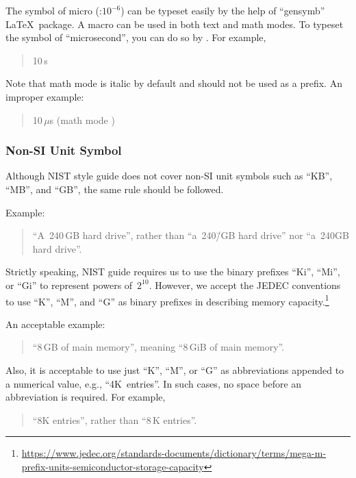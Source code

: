 The symbol of micro (\micro :$10^{-6}$) can be typeset easily by
the help of ``gensymb'' \LaTeX\ package.
A macro \qco{\\micro} can be used in both text and math modes.
To typeset the symbol of ``microsecond'', you can do
so by .
For example,
\begin{quote}
  10\,\micro s
\end{quote}

Note that math mode \qco{\\mu} is italic by default and should not
be used as a prefix.
An improper example:
\begin{quote}
  10\,$\mu $s (math mode \qco{\\mu})
\end{quote}

\subsubsection{Non-SI Unit Symbol}
\label{sec:app:styleguide:Non-SI Unit Symbol}

Although NIST style guide does not cover non-SI unit symbols
such as ``KB'', ``MB'', and ``GB'', the same rule should be followed.

Example:

\begin{quote}
  ``A~240\,GB hard drive'', rather than ``a~240\=/GB hard drive''
  nor ``a~240GB hard drive''.
\end{quote}

Strictly speaking, NIST guide requires us to use the binary prefixes
``Ki'', ``Mi'', or ``Gi'' to represent powers of~$2^{10}$.
However, we accept the JEDEC conventions to use ``K'', ``M'',
and ``G'' as binary prefixes in describing memory capacity.\footnote{
  \url{https://www.jedec.org/standards-documents/dictionary/terms/mega-m-prefix-units-semiconductor-storage-capacity}}

An acceptable example:
\begin{quote}
  ``8\,GB of main memory'', meaning ``8\,GiB of main memory''.
\end{quote}

Also, it is acceptable to use just ``K'', ``M'', or ``G'' as abbreviations
appended to a numerical value, e.g., ``4K~entries''.
In such cases, no space before an abbreviation is required.
For example,

\begin{quote}
  ``8K entries'', rather than ``8\,K entries''.
\end{quote}

